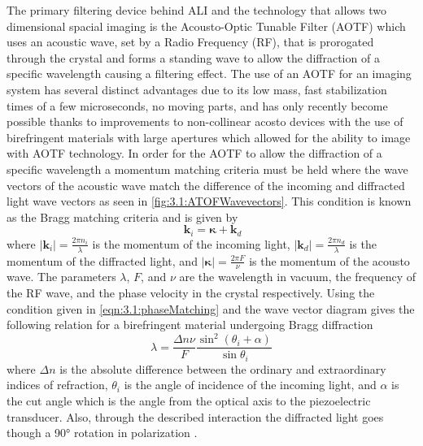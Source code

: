 \documentclass[12pt]{article}
\begin{document}
The primary filtering device behind ALI and the technology that allows two dimensional spacial imaging is the Acousto-Optic Tunable Filter (AOTF) which uses an acoustic wave, set by a Radio Frequency (RF), that is prorogated through the crystal and forms a standing wave to allow the diffraction of a specific wavelength causing a filtering effect. The use of an AOTF for an imaging system has several distinct advantages due to its low mass, fast stabilization times of a few microseconds, no moving parts, and has only recently become possible thanks to improvements to non-collinear acosto devices with the use of birefringent materials with large apertures \citep{Chang1974, Voloshinov2007} which allowed for the ability to image with AOTF technology. In order for the AOTF to allow the diffraction of a specific wavelength a momentum matching criteria must be held where the wave vectors of the acoustic wave match the difference of the incoming and diffracted light wave vectors as seen in \autoref{fig:3.1:ATOFWavevectors}. This condition is known as the Bragg matching criteria and is given by
\begin{equation}
    \ \mathbf{k}_{i} = \boldsymbol\kappa + \mathbf{k}_{d}
    \label{eqn:3.1:phaseMatching}
\end{equation}
where $\left|\mathbf{k}_{i}\right| = \frac{2\pi n_{i}}{\lambda}$ is the momentum of the incoming light, $\left|\mathbf{k}_{d}\right| = \frac{2\pi n_{d}}{\lambda}$ is the momentum of the diffracted light, and $\left|\boldsymbol\kappa\right| = \frac{2\pi F}{\nu}$ is the momentum of the acousto wave. The parameters $\lambda$, $F$, and $\nu$ are the wavelength in vacuum, the frequency of the RF wave, and the phase velocity in the crystal respectively. Using the condition given in \autoref{eqn:3.1:phaseMatching} and the wave vector diagram gives the following relation for a birefringent material undergoing Bragg diffraction
\begin{equation}
    \lambda  = \frac{\Delta n\nu}{F}\frac{\sin^{2}(\theta_{i}+\alpha)}{\sin\theta_{i}}
    \label{eqn:3.1:AOTFWavelengthDependance}
\end{equation}
where $\Delta n$ is the absolute difference between the ordinary and extraordinary indices of refraction, $\theta_{i}$ is the angle of incidence of the incoming light, and $\alpha$ is the cut angle which is the angle from the optical axis to the piezoelectric transducer. Also, through the described interaction the diffracted light goes though a 90\si{\degree} rotation in polarization \citep{Voloshinov1996}.
\end{document}
